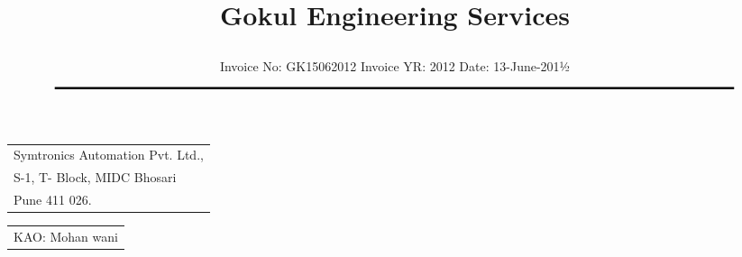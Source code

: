 \documentclass[11pt,A4]{article}
\title{\vspace*{0.5cm} \centerline{ \Huge { \bf \hspace{0cm} Gokul Engineering Services}\vspace*{-0.5cm}}}
\author{%
 \scriptsize Invoice No: GK15062012  \hspace*{4cm}  Invoice YR: 2012 \hspace*{4cm} Date:  13-June-201½\\
$\rule{7.5in}{0.5mm}$}
\date{}
\begin{document}
\maketitle
\thispagestyle{empty}
\vspace*{0cm}	
\begin{flushleft}
{\footnotesize{
\begin{tabular}{l}
Symtronics Automation Pvt. Ltd.,\\
S-1, T- Block, MIDC Bhosari\\
Pune 411 026.
\end{tabular}
}}
\end{flushleft}

\vspace*{-1cm}
\vspace*{-20pt}

\begin{flushright}
\begin{tabular}{l}
 KAO: Mohan wani\\
\end{tabular}
\end{flushright}
\vspace{1cm}

\end{document}
